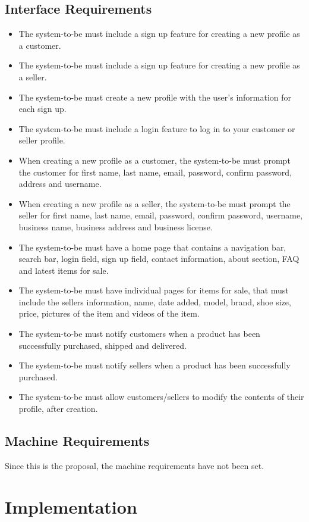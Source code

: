 \subsection{Interface Requirements}
\begin{itemize}
  \item The system-to-be must include a sign up feature for creating a new profile as a customer.
  \item The system-to-be must include a sign up feature for creating a new profile as a seller.
  \item The system-to-be must create a new profile with the user's information for each sign up.
  \item The system-to-be must include a login feature to log in to your customer or seller profile.
  \item When creating a new profile as a customer, the system-to-be must prompt the customer for first name, last name, email, password, confirm password, address and username.
  \item When creating a new profile as a seller, the system-to-be must prompt the seller for first name, last name, email, password, confirm password, username, business name, business address and business license.
  \item The system-to-be must have a home page that contains a navigation bar, search bar, login field, sign up field, contact information, about section, FAQ and latest items for sale.
  \item The system-to-be must have individual pages for items for sale, that must include the sellers information, name, date added, model, brand, shoe size, price, pictures of the item and videos of the item.
  \item The system-to-be must notify customers when a product has been successfully purchased, shipped and delivered.
  \item The system-to-be must notify sellers when a product has been successfully purchased.
  \item The system-to-be must allow customers/sellers to modify the contents of their profile, after creation.
\end{itemize}
\subsection{Machine Requirements}
Since this is the proposal, the machine requirements have not been set.
\section{Implementation}
